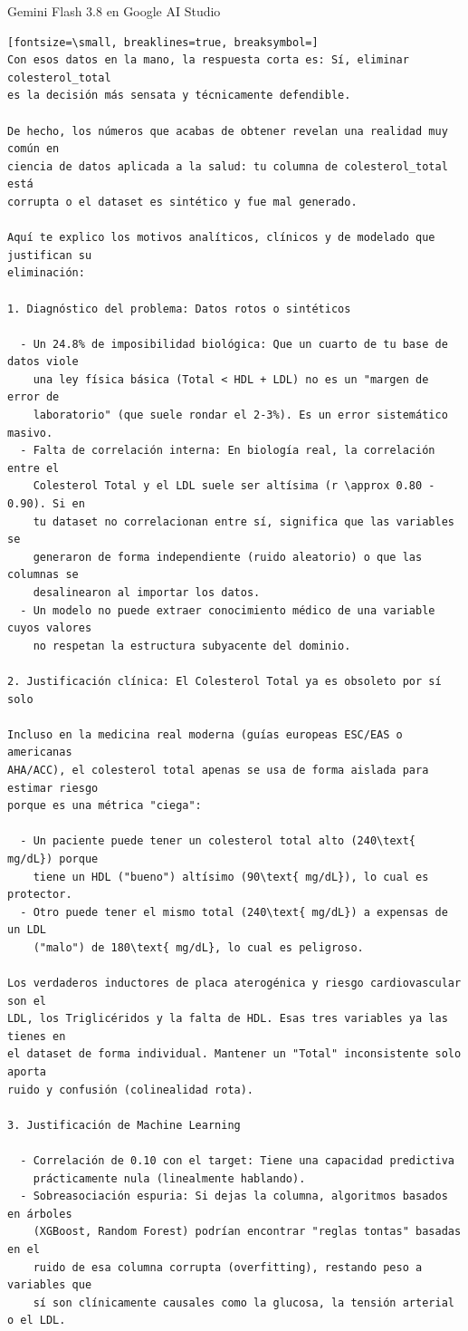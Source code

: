 \documentclass[12pt,a4paper,oneside]{book}
\begin{document}
\begin{iaresp}{Gemini Flash 3.8 en Google AI Studio}
\begin{Verbatim}[fontsize=\small, breaklines=true, breaksymbol=]
Con esos datos en la mano, la respuesta corta es: Sí, eliminar colesterol_total
es la decisión más sensata y técnicamente defendible.

De hecho, los números que acabas de obtener revelan una realidad muy común en
ciencia de datos aplicada a la salud: tu columna de colesterol_total está
corrupta o el dataset es sintético y fue mal generado.

Aquí te explico los motivos analíticos, clínicos y de modelado que justifican su
eliminación:

1. Diagnóstico del problema: Datos rotos o sintéticos

  - Un 24.8% de imposibilidad biológica: Que un cuarto de tu base de datos viole
    una ley física básica (Total < HDL + LDL) no es un "margen de error de
    laboratorio" (que suele rondar el 2-3%). Es un error sistemático masivo.
  - Falta de correlación interna: En biología real, la correlación entre el
    Colesterol Total y el LDL suele ser altísima (r \approx 0.80 - 0.90). Si en
    tu dataset no correlacionan entre sí, significa que las variables se
    generaron de forma independiente (ruido aleatorio) o que las columnas se
    desalinearon al importar los datos.
  - Un modelo no puede extraer conocimiento médico de una variable cuyos valores
    no respetan la estructura subyacente del dominio.

2. Justificación clínica: El Colesterol Total ya es obsoleto por sí solo

Incluso en la medicina real moderna (guías europeas ESC/EAS o americanas
AHA/ACC), el colesterol total apenas se usa de forma aislada para estimar riesgo
porque es una métrica "ciega":

  - Un paciente puede tener un colesterol total alto (240\text{ mg/dL}) porque
    tiene un HDL ("bueno") altísimo (90\text{ mg/dL}), lo cual es protector.
  - Otro puede tener el mismo total (240\text{ mg/dL}) a expensas de un LDL
    ("malo") de 180\text{ mg/dL}, lo cual es peligroso.

Los verdaderos inductores de placa aterogénica y riesgo cardiovascular son el
LDL, los Triglicéridos y la falta de HDL. Esas tres variables ya las tienes en
el dataset de forma individual. Mantener un "Total" inconsistente solo aporta
ruido y confusión (colinealidad rota).

3. Justificación de Machine Learning

  - Correlación de 0.10 con el target: Tiene una capacidad predictiva
    prácticamente nula (linealmente hablando).
  - Sobreasociación espuria: Si dejas la columna, algoritmos basados en árboles
    (XGBoost, Random Forest) podrían encontrar "reglas tontas" basadas en el
    ruido de esa columna corrupta (overfitting), restando peso a variables que
    sí son clínicamente causales como la glucosa, la tensión arterial o el LDL.
\end{Verbatim}
\end{iaresp}
\end{document}
